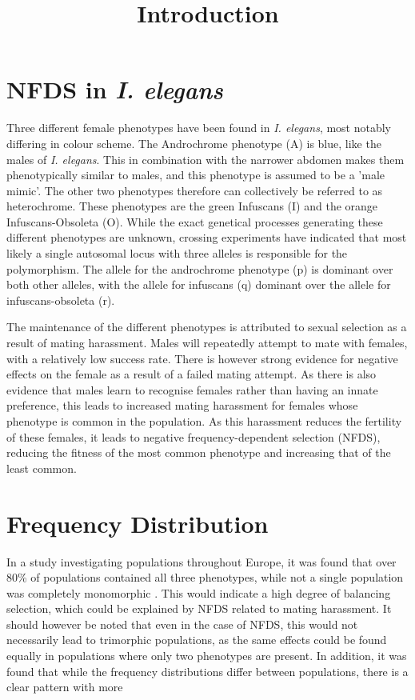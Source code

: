\documentclass{article}
\title{Introduction}
\date{\vspace{-5ex}}
\begin{document}
\maketitle
\section{NFDS in \textit{I. elegans}}
Three different female phenotypes have been found in \textit{I. elegans}, most notably differing in colour scheme. The Androchrome phenotype (A) is blue, like the males of \textit{I. elegans}. This in combination with the narrower abdomen makes them phenotypically similar to males, and this phenotype is assumed to be a 'male mimic'. The other two phenotypes therefore can collectively be referred to as heterochrome. These phenotypes are the green Infuscans (I) and the orange Infuscans-Obsoleta (O). While the exact genetical processes generating these different phenotypes are unknown, crossing experiments have indicated that most likely a single autosomal locus with three alleles is responsible for the polymorphism\cite{Cordero1990}. The allele for the androchrome phenotype (p) is dominant over both other alleles, with the allele for infuscans (q) dominant over the allele for infuscans-obsoleta (r)\cite{Cordero1990}.

The maintenance of the different phenotypes is attributed to sexual selection as a result of mating harassment. Males will repeatedly attempt to mate with females, with a relatively low success rate. There is however strong evidence for negative effects on the female as a result of a failed mating attempt. As there is also evidence that males learn to recognise females rather than having an innate preference, this leads to increased mating harassment for females whose phenotype is common in the population. As this harassment reduces the fertility of these females, it leads to negative frequency-dependent selection (NFDS), reducing the fitness of the most common phenotype and increasing that of the least common.

\section{Frequency Distribution}
In a study investigating populations throughout Europe, it was found that over 80\% of populations contained all three phenotypes, while not a single population was completely monomorphic \cite{Gosden2011}. This would indicate a high degree of balancing selection, which could be explained by NFDS related to mating harassment. It should however be noted that even in the case of NFDS, this would not necessarily lead to trimorphic populations, as the same effects could be found equally in populations where only two phenotypes are present. In addition, it was found that while the frequency distributions differ between populations, there is a clear pattern with more 

\printbibliography
\end{document}
